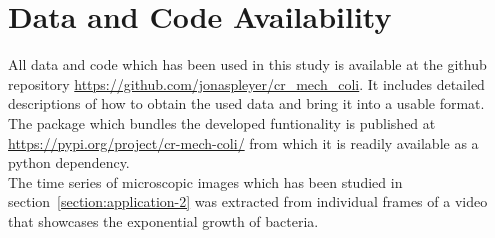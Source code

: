 \documentclass[10pt,letterpaper]{article}
\begin{document}

\section{Data and Code Availability}
\label{section:data-code-availability}
All data and code which has been used in this study is available at the github repository
\url{https://github.com/jonaspleyer/cr\_mech\_coli}.
It includes detailed descriptions of how to obtain the used data and bring it into a usable format.
The package which bundles the developed funtionality is published at
\url{https://pypi.org/project/cr-mech-coli/} from which it is readily available as a python
dependency.\\
The time series of microscopic images which has been studied in section~\ref{section:application-2}
was extracted from individual frames of a video~\cite{https://doi.org/10.3203/iwf/k-129} that
showcases the exponential growth of bacteria.



\end{document}
